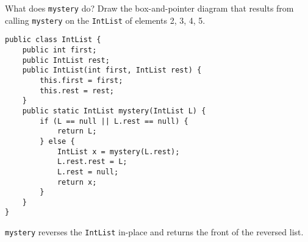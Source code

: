 \begin{blocksection}
\question What does \texttt{mystery} do? Draw the box-and-pointer diagram that results from calling \lstinline$mystery$ on the \lstinline$IntList$ of elements 2, 3, 4, 5.

\begin{lstlisting}
public class IntList {
    public int first;
    public IntList rest;
    public IntList(int first, IntList rest) {
        this.first = first;
        this.rest = rest;
    }
    public static IntList mystery(IntList L) {
        if (L == null || L.rest == null) {
            return L;
        } else {
            IntList x = mystery(L.rest);
            L.rest.rest = L;
            L.rest = null;
            return x;
        }
    }
}
\end{lstlisting}

\begin{solution}
\lstinline$mystery$ reverses the \lstinline$IntList$ in-place and returns the front of the reversed list.
\end{solution}
\end{blocksection}